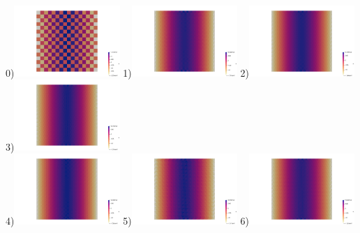\begin{center}
0)\includegraphics[width=4cm]{python_codes/fieldstone_78/results/exp01/16x16/p0}
1)\includegraphics[width=4cm]{python_codes/fieldstone_78/results/exp01/16x16/p1}
2)\includegraphics[width=4cm]{python_codes/fieldstone_78/results/exp01/16x16/p2}
3)\includegraphics[width=4cm]{python_codes/fieldstone_78/results/exp01/16x16/p3}\\
4)\includegraphics[width=4cm]{python_codes/fieldstone_78/results/exp01/16x16/p4}
5)\includegraphics[width=4cm]{python_codes/fieldstone_78/results/exp01/16x16/p5}
6)\includegraphics[width=4cm]{python_codes/fieldstone_78/results/exp01/16x16/p6}

\end{center}
